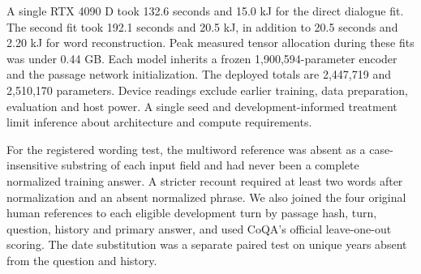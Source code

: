 A single RTX 4090 D took 132.6 seconds and 15.0 kJ for the direct dialogue fit. The second fit took 192.1 seconds and 20.5 kJ, in addition to 20.5 seconds and 2.20 kJ for word reconstruction. Peak measured tensor allocation during these fits was under 0.44 GB. Each model inherits a frozen 1,900,594-parameter encoder and the passage network initialization. The deployed totals are 2,447,719 and 2,510,170 parameters. Device readings exclude earlier training, data preparation, evaluation and host power. A single seed and development-informed treatment limit inference about architecture and compute requirements.

For the registered wording test, the multiword reference was absent as a case-insensitive substring of each input field and had never been a complete normalized training answer. A stricter recount required at least two words after normalization and an absent normalized phrase. We also joined the four original human references to each eligible development turn by passage hash, turn, question, history and primary answer, and used CoQA's official leave-one-out scoring. The date substitution was a separate paired test on unique years absent from the question and history.
